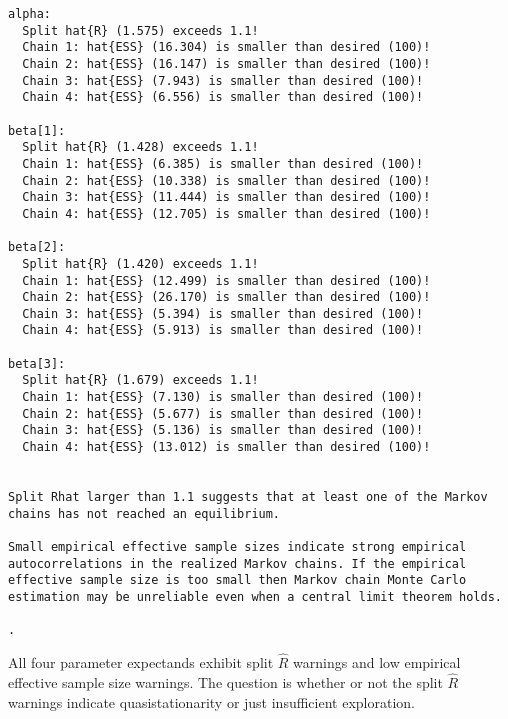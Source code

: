 \documentclass[
  letterpaper,
  DIV=11,
  numbers=noendperiod]{scrartcl}
\newenvironment{Shaded}{\begin{snugshade}}{\end{snugshade}}
\newcommand{\DecValTok}[1]{\textcolor[rgb]{0.68,0.00,0.00}{#1}}
\newcommand{\FunctionTok}[1]{\textcolor[rgb]{0.28,0.35,0.67}{#1}}
\newcommand{\NormalTok}[1]{\textcolor[rgb]{0.00,0.23,0.31}{#1}}
\newcommand{\SpecialCharTok}[1]{\textcolor[rgb]{0.37,0.37,0.37}{#1}}
\begin{document}
\begin{Shaded}
\end{Shaded}

\begin{verbatim}
alpha:
  Split hat{R} (1.575) exceeds 1.1!
  Chain 1: hat{ESS} (16.304) is smaller than desired (100)!
  Chain 2: hat{ESS} (16.147) is smaller than desired (100)!
  Chain 3: hat{ESS} (7.943) is smaller than desired (100)!
  Chain 4: hat{ESS} (6.556) is smaller than desired (100)!

beta[1]:
  Split hat{R} (1.428) exceeds 1.1!
  Chain 1: hat{ESS} (6.385) is smaller than desired (100)!
  Chain 2: hat{ESS} (10.338) is smaller than desired (100)!
  Chain 3: hat{ESS} (11.444) is smaller than desired (100)!
  Chain 4: hat{ESS} (12.705) is smaller than desired (100)!

beta[2]:
  Split hat{R} (1.420) exceeds 1.1!
  Chain 1: hat{ESS} (12.499) is smaller than desired (100)!
  Chain 2: hat{ESS} (26.170) is smaller than desired (100)!
  Chain 3: hat{ESS} (5.394) is smaller than desired (100)!
  Chain 4: hat{ESS} (5.913) is smaller than desired (100)!

beta[3]:
  Split hat{R} (1.679) exceeds 1.1!
  Chain 1: hat{ESS} (7.130) is smaller than desired (100)!
  Chain 2: hat{ESS} (5.677) is smaller than desired (100)!
  Chain 3: hat{ESS} (5.136) is smaller than desired (100)!
  Chain 4: hat{ESS} (13.012) is smaller than desired (100)!


Split Rhat larger than 1.1 suggests that at least one of the Markov
chains has not reached an equilibrium.

Small empirical effective sample sizes indicate strong empirical
autocorrelations in the realized Markov chains. If the empirical
effective sample size is too small then Markov chain Monte Carlo
estimation may be unreliable even when a central limit theorem holds.

.
\end{verbatim}

All four parameter expectands exhibit split \(\hat{R}\) warnings and low
empirical effective sample size warnings. The question is whether or not
the split \(\hat{R}\) warnings indicate quasistationarity or just
insufficient exploration.
\end{document}
